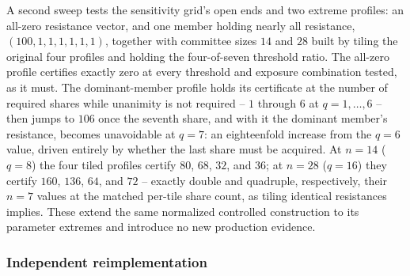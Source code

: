 A second sweep tests the sensitivity grid's open ends and two extreme
profiles: an all-zero resistance vector, and one member holding nearly all
resistance, \((100,1,1,1,1,1,1)\), together with committee sizes \(14\) and
\(28\) built by tiling the original four profiles and holding the
four-of-seven threshold ratio. The all-zero profile certifies exactly zero at
every threshold and exposure combination tested, as it must. The
dominant-member profile holds its certificate at the number of required
shares while unanimity is not required -- \(1\) through \(6\) at
\(q=1,\ldots,6\) -- then jumps to \(106\) once the seventh share, and with it
the dominant member's resistance, becomes unavoidable at \(q=7\): an
eighteenfold increase from the \(q=6\) value, driven entirely by whether the
last share must be acquired. At \(n=14\) (\(q=8\)) the four tiled profiles
certify \(80\), \(68\), \(32\), and \(36\); at \(n=28\) (\(q=16\)) they certify
\(160\), \(136\), \(64\), and \(72\) -- exactly double and quadruple,
respectively, their \(n=7\) values at the matched per-tile share count, as
tiling identical resistances implies. These extend the same normalized
controlled construction to its parameter extremes and introduce no new
production evidence.

\subsubsection{Independent reimplementation}
\label{subsec:independent-reimplementation}

